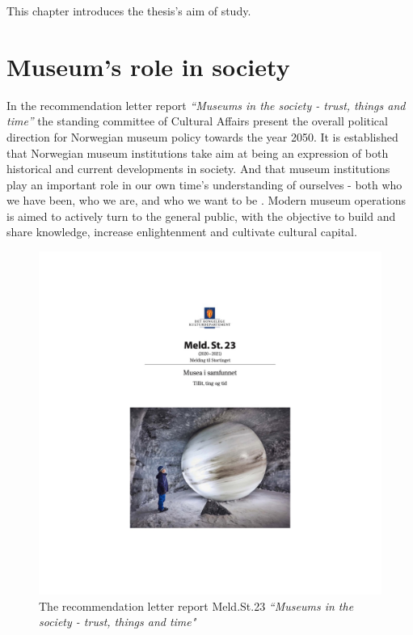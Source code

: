 This chapter introduces the thesis's aim of study. 

\section{Museum's role in society}
In the recommendation letter report \emph{“Museums in the society - trust, things and time”} the standing committee of Cultural Affairs present the overall political direction for Norwegian museum policy towards the year 2050. It is established that Norwegian museum institutions take aim at being an expression of both historical and current developments in society. And that museum institutions play an important role in our own time’s understanding of ourselves - both who we have been, who we are, and who we want to be \autocite[p. 7]{melding23}. Modern museum operations is aimed to actively turn to the general public, with the objective to build and share knowledge, increase enlightenment and cultivate cultural capital.

\begin{figure}[H]
\includegraphics[width=12cm]{pictures/stortingsmelding.jpg}
\caption{The recommendation letter report Meld.St.23 \emph{“Museums in the society - trust, things and time"}}
\centering 
\end{figure}

